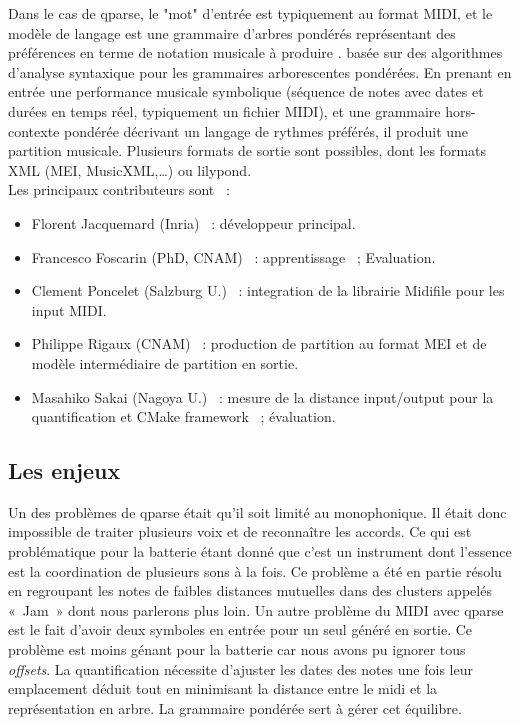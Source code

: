 Dans le cas de qparse, le "mot" d’entrée est typiquement au format MIDI, et le
modèle de langage est une grammaire d’arbres pondérés représentant des
préférences en terme de notation musicale à produire \cite{droste2009handbook}.
basée sur des algorithmes d’analyse syntaxique pour les grammaires
arborescentes pondérées. En prenant en entrée une performance musicale
symbolique (séquence de notes avec dates et durées en temps réel, typiquement
un fichier MIDI), et une grammaire hors-contexte pondérée décrivant un langage
de rythmes préférés, il produit une partition musicale. Plusieurs formats de
sortie sont possibles, dont les formats XML (MEI, MusicXML,…) ou lilypond.\\

Les principaux contributeurs sont~ :
\begin{itemize}
	\item Florent Jacquemard (Inria)~ : développeur principal.
	\item Francesco Foscarin (PhD, CNAM)~ : apprentissage~ ; Evaluation.
	\item Clement Poncelet (Salzburg U.)~ : integration de la librairie Midifile
        pour les input MIDI.
	\item Philippe Rigaux (CNAM)~ : production de partition au format MEI et de
        modèle intermédiaire de partition en sortie.
	\item Masahiko Sakai (Nagoya U.)~ : mesure de la distance input/output pour
        la quantification et CMake framework~ ; évaluation.
\end{itemize}

\subsection*{Les enjeux}
Un des problèmes de qparse était qu’il soit limité au monophonique. Il était
donc impossible de traiter plusieurs voix et de reconnaître les accords. Ce qui
est problématique pour la batterie étant donné que c’est un instrument dont l’essence
est la coordination de plusieurs sons à la fois. Ce problème a été en partie résolu
en regroupant les notes de faibles distances mutuelles dans des clusters appelés
«~Jam~» dont nous parlerons plus loin.
Un autre problème du MIDI avec qparse est le fait d’avoir deux symboles en entrée
pour un seul généré en sortie. Ce problème est moins génant pour la batterie car
nous avons pu ignorer tous \textit{offsets}.
La quantification nécessite d’ajuster les dates des notes une fois leur emplacement
déduit tout en minimisant la distance entre le midi et la représentation en arbre. La grammaire pondérée sert à gérer cet équilibre.
